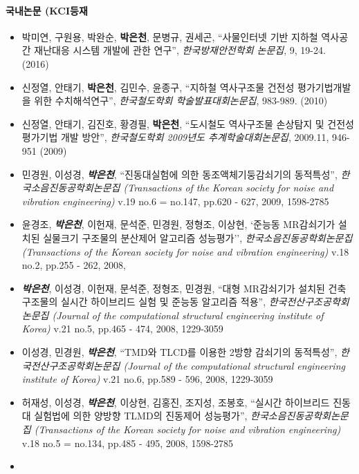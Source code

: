 \documentclass[]{article}
\providecommand{\tightlist}{%
  \setlength{\itemsep}{0pt}\setlength{\parskip}{0pt}}
\let\oldparagraph\paragraph
\renewcommand{\paragraph}[1]{\oldparagraph{#1}\mbox{}}
\begin{document}
\paragraph{국내논문 (KCI등재}

\begin{itemize}
\tightlist
\item
  박미연, 구원용, 박완순, \textbf{박은천}, 문병규, 권세곤, ``사물인터넷 기반 지하철 역사공간 재난대응 시스템 개발에 관한 연구'', \emph{한국방재안전학회 논문집}, 9, 19-24. (2016)
\item
 신정열, 안태기, \textbf{박은천}, 김민수, 윤종구, ``지하철 역사구조물 건전성 평가기법개발을 위한 수치해석연구'', \emph{한국철도학회 학술발표대회논문집}, 983-989. (2010)
\item
  신정열, 안태기, 김진호, 황경필, \textbf{박은천}, ``도시철도 역사구조물 손상탐지 및 건전성 평가기법 개발 방안'', \emph{한국철도학회 2009년도 추계학술대회논문집}, 2009.11, 946-951 (2009)
\item
  민경원, 이성경, \emph{\textbf{박은천}}, ``진동대실험에 의한 동조액체기둥감쇠기의 동적특성'', \emph{한국소음진동공학회논문집 (Transactions of the Korean society for noise and vibration engineering)} v.19 no.6 = no.147, pp.620 - 627, 2009, 1598-2785
\item
  윤경조, \emph{\textbf{박은천}}, 이헌재, 문석준, 민경원, 정형조, 이상현, `준능동 MR감쇠기가 설치된 실물크기 구조물의 분산제어 알고리즘 성능평가'', \emph{한국소음진동공학회논문집
  (Transactions of the Korean society for noise and vibration
  engineering)} v.18 no.2, pp.255 - 262, 2008,
\item
  \emph{\textbf{박은천}}, 이성경, 이헌재, 문석준, 정형조, 민경원, ``대형 MR감쇠기가 설치된 건축구조물의 실시간 하이브리드 실험 및 준능동 알고리즘 적용'', \emph{한국전산구조공학회논문집 (Journal of the   computational structural engineering institute of Korea)} v.21 no.5, pp.465 - 474, 2008, 1229-3059
\item
  이성경, 민경원, \emph{\textbf{박은천}}, ``TMD와 TLCD를 이용한 2방향 감쇠기의
  동적특성'', \emph{한국전산구조공학회논문집 (Journal of the
  computational structural engineering institute of Korea)} v.21 no.6,
  pp.589 - 596, 2008, 1229-3059
\item
  허재성, 이성경, \emph{\textbf{박은천}}, 이상현, 김홍진, 조지성, 조봉호,
  ``실시간 하이브리드 진동대 실험법에 의한 양방향 TLMD의 진동제어
  성능평가'', \emph{한국소음진동공학회논문집 (Transactions of the Korean
  society for noise and vibration engineering)} v.18 no.5 = no.134,
  pp.485 - 495, 2008, 1598-2785
\item

\end{itemize}
\end{document}
